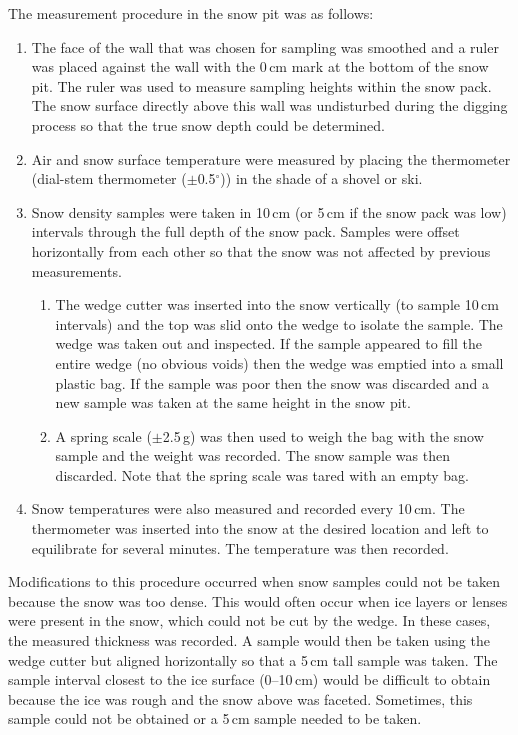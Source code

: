 \documentclass{sfuthesis}
\begin{document}
The measurement procedure in the snow pit was as follows:
\begin{enumerate}
\item The face of the wall that was chosen for sampling was smoothed and a ruler was placed against the wall with the 0\,cm mark at the bottom of the snow pit. The ruler was used to measure sampling heights within the snow pack. The snow surface directly above this wall was undisturbed during the digging process so that the true snow depth could be determined. 
\item Air and snow surface temperature were measured by placing the thermometer (dial-stem thermometer ($\pm$0.5$^\circ$)) in the shade of a shovel or ski. 
\item Snow density samples were taken in 10\,cm (or 5\,cm if the snow pack was low) intervals through the full depth of the snow pack. Samples were offset horizontally from each other so that the snow was not affected by previous measurements. 
	\begin{enumerate}
	\item The wedge cutter was inserted into the snow vertically (to sample 10\,cm intervals) and the top was slid onto the wedge to isolate the sample. The wedge was taken out and inspected. If the sample appeared to fill the entire wedge (no obvious voids) then the wedge was emptied into a small plastic bag. If the sample was poor then the snow was discarded and a new sample was taken at the same height in the snow pit. 
	\item A spring scale ($\pm$2.5\,g) was then used to weigh the bag with the snow sample and the weight was recorded. The snow sample was then discarded. Note that the spring scale was tared with an empty bag.
	\end{enumerate}
\item Snow temperatures were also measured and recorded every 10\,cm. The thermometer was inserted into the snow at the desired location and left to equilibrate for several minutes. The temperature was then recorded.
\end{enumerate}

Modifications to this procedure occurred when snow samples could not be taken because the snow was too dense. This would often occur when ice layers or lenses were present in the snow, which could not be cut by the wedge. In these cases, the measured thickness was recorded. A sample would then be taken using the wedge cutter but aligned horizontally so that a 5\,cm tall sample was taken. The sample interval closest to the ice surface (0--10\,cm) would be difficult to obtain because the ice was rough and the snow above was faceted. Sometimes, this sample could not be obtained or a 5\,cm sample needed to be taken. 
\end{document}
